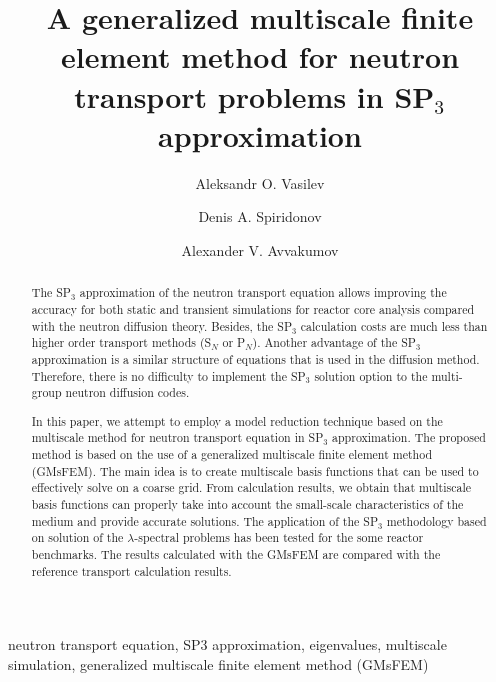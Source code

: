 \documentclass[authoryear]{elsarticle}
\begin{document}
\begin{frontmatter}
\title{A generalized multiscale finite element method for neutron transport problems in SP$_3$ approximation}

\author[nefu]{Aleksandr O. Vasilev}

\author[nefu]{Denis A. Spiridonov}

\author[ki]{Alexander V. Avvakumov}

\address[nefu]{North-Eastern Federal University, 58, Belinskogo, Yakutsk, Russia}
\address[ki]{National Research Center \emph{Kurchatov Institute},  1, Sq. Academician Kurchatov, Moscow, Russia}


\begin{abstract}
The SP$_3$ approximation of the neutron transport equation allows improving the accuracy for both static and transient simulations for reactor core analysis compared with the neutron diffusion theory. 
Besides, the SP$_3$ calculation costs are much less than higher order transport methods (S$_N$ or P$_N$).
Another advantage of the SP$_3$ approximation is a similar structure of equations that is used in the diffusion method. 
Therefore, there is no difficulty to implement the SP$_3$ solution option to the multi-group neutron diffusion codes. 

In this paper, we attempt to employ a model reduction technique based on the multiscale method for neutron transport equation in SP$_3$ approximation. 
The proposed method is based on the use of a generalized multiscale finite element method (GMsFEM).
The main idea is to create multiscale basis functions that can be used to effectively solve on a coarse grid.
From calculation results, we obtain that multiscale basis functions can properly take into account the small-scale characteristics of the medium and provide accurate solutions. 
The application of the SP$_3$ methodology based on solution of the $\lambda$-spectral problems has been tested for the some reactor benchmarks.
The results calculated with the GMsFEM are compared with the reference transport calculation results.
\end{abstract}

\begin{keyword}
neutron transport equation, SP3 approximation, eigenvalues, multiscale simulation, generalized multiscale finite element method (GMsFEM)
\end{keyword}

\end{frontmatter}
\end{document}
